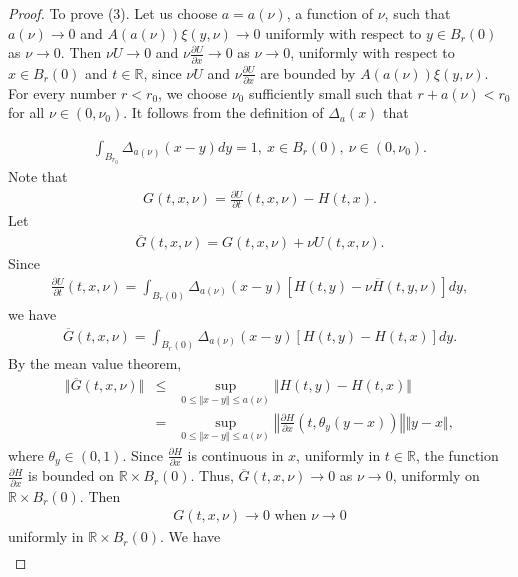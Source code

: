 \documentclass[english,reqno]{amsart}
\numberwithin{equation}{section}
\theoremstyle{plain}
\theoremstyle{definition}
\theoremstyle{remark}
\newcommand{\bb}[1]{{\mathbb{#1}}}
\begin{document}
\begin{proof}
To prove (3). Let us choose $a=a(\nu)$, a function of $\nu$, such that $a(\nu)\rightarrow 0$ and $A(a(\nu))\xi(y,\nu)\rightarrow 0$ uniformly with respect to $y\in B_r(0)$ as $\nu\rightarrow 0$.  
Then $\nu U\rightarrow 0$ and $\nu \frac{\partial U}{\partial x}\rightarrow 0$ as $\nu \rightarrow 0$, uniformly with respect to $x\in B_r(0)$ and $t\in \mathbb{R}$, since $\nu U$ and $\nu \frac{\partial U}{\partial x}$ are bounded by $A(a(\nu))\xi(y,\nu)$.  
For every number $r<r_0$, we choose $\nu_0$ sufficiently small such that $r+a(\nu)<r_0$ for all $\nu\in(0,\nu_0)$.  
It follows from the definition of $\Delta_a(x)$ that

\begin{eqnarray*}
\int_{B_{r_{0}}} \Delta_{a(\nu)}(x-y)dy=1,\ x\in B_{r}(0),\ \nu\in(0,\nu_0).
\end{eqnarray*}
Note that
\begin{eqnarray*}
G(t,x,\nu)=\frac{\partial U}{\partial t}(t,x,\nu)	-H(t,x).
\end{eqnarray*}
Let
\begin{eqnarray*}
\overline{G}(t,x,\nu)= G(t,x,\nu)+\nu U(t,x,\nu).
\end{eqnarray*}
Since
\begin{eqnarray*}
\frac{\partial U}{\partial t}(t,x,\nu)=\int_{B_{r}(0)}\Delta_{a(\nu)}(x-y)[H(t,y)-\nu\overline{H}(t,y,\nu)]dy,
\end{eqnarray*}
we have 
\begin{eqnarray*}
\overline{G}(t,x,\nu)=\int_{B_{r}(0)}\Delta_{a(\nu)}(x-y)[H(t,y)-H(t,x)]dy.
\end{eqnarray*}
By the mean value theorem,
\begin{eqnarray*}
\Vert\overline{G}(t,x,\nu) \Vert &\leq& \sup_{0\leq\Vert x-y\Vert\leq a(\nu)} \Vert H(t,y)-H(t,x) \Vert \\
&=& \sup_{0\leq\Vert x-y\Vert\leq a(\nu)} \left\Vert \frac{\partial H}{\partial x}(t, \theta_{y} (y-x)) \right\Vert \Vert y-x\Vert,
\end{eqnarray*}
where $\theta_y \in (0,1)$. Since $\frac{\partial H}{\partial x}$ is continuous in $x$, uniformly in $t\in\mathbb{R}$, the function $\frac{\partial H}{\partial x}$ is bounded on $\mathbb{R}\times B_{r}(0)$.  
Thus, $\overline{G}(t,x,\nu)\rightarrow 0$ as $\nu\rightarrow 0$, uniformly on $\mathbb{R}\times B_{r}(0)$. Then
\begin{eqnarray*}
G(t,x,\nu)\rightarrow 0 \mbox{  when } \nu\rightarrow 0
\end{eqnarray*}
uniformly in $\bb{R}\times B_{r}(0)$. 
We have
\begin{eqnarray*}

\end{eqnarray*}
\end{proof}
\end{document}
